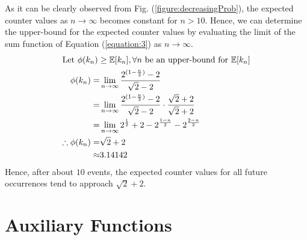 \documentclass[longpaper, english, final, times]{revdetua}
\begin{document}
		As it can be clearly observed from Fig. (\ref{figure:decreasingProb}), the expected counter values as $n\to \infty$ becomes constant for $n > 10$. Hence, we can determine the upper-bound for the expected counter values by evaluating the limit of the sum function of Equation (\ref{equation:3}) as $n \to \infty$.
		\begin{align*}
			\intertext{Let $\phi(k_n) \ge \mathbb{E}[k_n], \forall n$ be an upper-bound for $\mathbb{E}[k_n]$}
			\phi(k_n)=&\lim_{n\to \infty}\dfrac{2^{(1-\frac{n}{2})}-2}{\sqrt{2}-2} \\
			=&\lim_{n\to \infty}\dfrac{2^{(1-\frac{n}{2})}-2}{\sqrt{2}-2}\cdot \dfrac{\sqrt{2}+2}{\sqrt{2}+2}\\
			=&\lim_{n\to \infty} 2^{\frac{1}{2}}+2-2^{\frac{1-n}{2}}-2^{\frac{2-n}{2}} \\
			\therefore \phi(k_n)=&\sqrt{2}+2 \\
			\approx & 3.14142
		\end{align*}
		Hence, after about $10$ events, the expected counter values for all future occurrences tend to approach $\sqrt{2}+2$.
	
	\section{Auxiliary Functions}
	
		
	
\end{document}
